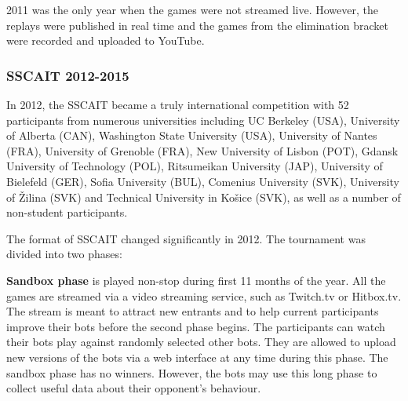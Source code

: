 \documentclass{llncs}
\begin{document}
2011 was the only year when the games were not streamed live. However, the replays were published in real time and the games from the elimination bracket were recorded and uploaded to YouTube.

\subsubsection{SSCAIT 2012-2015}
In 2012, the SSCAIT became a truly international competition with 52 participants from numerous universities including 
UC Berkeley (USA), University of Alberta (CAN), Washington State University (USA), University of Nantes (FRA), University of Grenoble (FRA), New University of Lisbon (POT), Gdansk University of Technology (POL), Ritsumeikan University (JAP), University of Bielefeld (GER), Sofia University (BUL), Comenius University (SVK), University of \v{Z}ilina (SVK) and Technical University in Ko\v{s}ice (SVK), as well as a number of non-student participants. 

The format of SSCAIT changed significantly in 2012. The tournament was divided into two phases:

\textbf{{Sandbox phase}} is played non-stop during first 11 months of the year. All the games are streamed via a video streaming service, such as Twitch.tv or Hitbox.tv. The stream is meant to attract new entrants and to help current participants improve their bots before the second phase begins. The participants can watch their bots play against randomly selected other bots. They are allowed to upload new versions of the bots via a web interface at any time during this phase. The  sandbox phase has no winners. However, the bots may use this long phase to collect useful data about their opponent's behaviour. 
\end{document}
